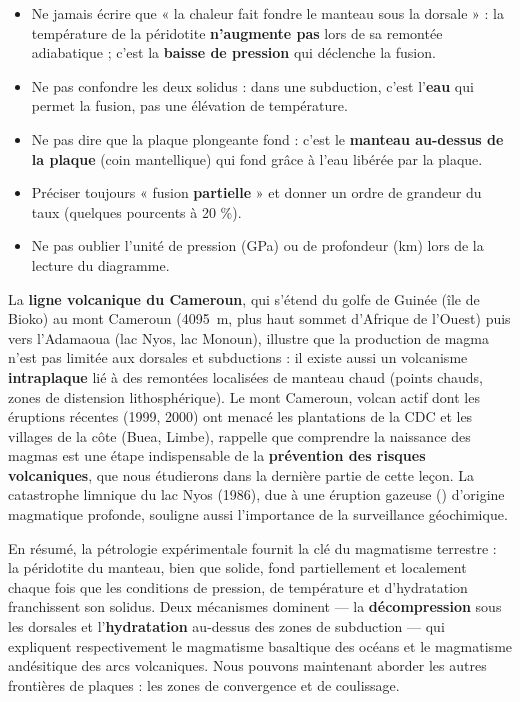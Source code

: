 \documentclass[11pt]{article}
\begin{document}
\begin{attention}
\begin{itemize}
\item Ne jamais écrire que « la chaleur fait fondre le manteau sous la dorsale » : la température de la péridotite \textbf{n'augmente pas} lors de sa remontée adiabatique ; c'est la \textbf{baisse de pression} qui déclenche la fusion.
\item Ne pas confondre les deux solidus : dans une subduction, c'est l'\textbf{eau} qui permet la fusion, pas une élévation de température.
\item Ne pas dire que la plaque plongeante fond : c'est le \textbf{manteau au-dessus de la plaque} (coin mantellique) qui fond grâce à l'eau libérée par la plaque.
\item Préciser toujours « fusion \textbf{partielle} » et donner un ordre de grandeur du taux (quelques pourcents à 20 \%).
\item Ne pas oublier l'unité de pression (GPa) ou de profondeur (km) lors de la lecture du diagramme.
\end{itemize}
\end{attention}

\begin{savaistu}
La \textbf{ligne volcanique du Cameroun}, qui s'étend du golfe de Guinée (île de Bioko) au mont Cameroun (\SI{4095}{m}, plus haut sommet d'Afrique de l'Ouest) puis vers l'Adamaoua (lac Nyos, lac Monoun), illustre que la production de magma n'est pas limitée aux dorsales et subductions : il existe aussi un volcanisme \textbf{intraplaque} lié à des remontées localisées de manteau chaud (points chauds, zones de distension lithosphérique). Le mont Cameroun, volcan actif dont les éruptions récentes (1999, 2000) ont menacé les plantations de la CDC et les villages de la côte (Buea, Limbe), rappelle que comprendre la naissance des magmas est une étape indispensable de la \textbf{prévention des risques volcaniques}, que nous étudierons dans la dernière partie de cette leçon. La catastrophe limnique du lac Nyos (1986), due à une éruption gazeuse () d'origine magmatique profonde, souligne aussi l'importance de la surveillance géochimique.
\end{savaistu}

En résumé, la pétrologie expérimentale fournit la clé du magmatisme terrestre : la péridotite du manteau, bien que solide, fond partiellement et localement chaque fois que les conditions de pression, de température et d'hydratation franchissent son solidus. Deux mécanismes dominent — la \textbf{décompression} sous les dorsales et l'\textbf{hydratation} au-dessus des zones de subduction — qui expliquent respectivement le magmatisme basaltique des océans et le magmatisme andésitique des arcs volcaniques. Nous pouvons maintenant aborder les autres frontières de plaques : les zones de convergence et de coulissage.
\end{document}
